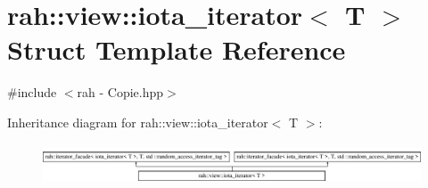 \hypertarget{structrah_1_1view_1_1iota__iterator}{}\section{rah\+::view\+::iota\+\_\+iterator$<$ T $>$ Struct Template Reference}
\label{structrah_1_1view_1_1iota__iterator}


{\ttfamily \#include $<$rah -\/ Copie.\+hpp$>$}

Inheritance diagram for rah\+::view\+::iota\+\_\+iterator$<$ T $>$\+:\begin{figure}[H]
\begin{center}
\leavevmode
\includegraphics[height=1.204301cm]{structrah_1_1view_1_1iota__iterator}
\end{center}
\end{figure}
